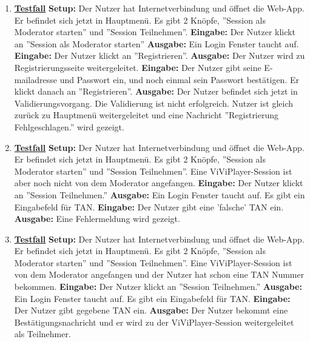 \begin{enumerate}
	\item \underline{\textbf{Testfall}} \linebreak
	\textbf{Setup:} Der Nutzer hat Internetverbindung und öffnet die Web-App. Er befindet sich jetzt in Hauptmenü. Es gibt 2 Knöpfe, ''Session als Moderator starten'' und ''Session Teilnehmen''. \linebreak
	\textbf{Eingabe:} Der Nutzer klickt an ''Session als Moderator starten'' \linebreak
	\textbf{Ausgabe:} Ein Login Fenster taucht auf.\linebreak
	\textbf{Eingabe:} Der Nutzer klickt an ''Registrieren''.\linebreak
	\textbf{Ausgabe:} Der Nutzer wird zu Registrierungsseite weitergeleitet.\linebreak
	\textbf{Eingabe:} Der Nutzer gibt seine E-mailadresse und Passwort ein, und noch einmal sein Passwort bestätigen. Er klickt danach an ''Registrieren''. \linebreak
	\textbf{Ausgabe:} Der Nutzer befindet sich jetzt in Validierungsvorgang. Die Validierung ist nicht erfolgreich. Nutzer ist gleich zurück zu Hauptmenü weitergeleitet und eine Nachricht ''Registrierung Fehlgeschlagen.'' wird gezeigt.\linebreak
	
	\item \underline{\textbf{Testfall}} \linebreak
	\textbf{Setup:} Der Nutzer hat Internetverbindung und öffnet die Web-App. Er befindet sich jetzt in Hauptmenü. Es gibt 2 Knöpfe, ''Session als Moderator starten'' und ''Session Teilnehmen''.
	Eine ViViPlayer-Session ist aber noch nicht von dem Moderator angefangen. \linebreak
	\textbf{Eingabe:} Der Nutzer klickt an ''Session Teilnehmen.'' \linebreak
	\textbf{Ausgabe:} Ein Login Fenster taucht auf. Es gibt ein Eingabefeld für TAN.\linebreak
	\textbf{Eingabe:} Der Nutzer gibt eine 'falsche' TAN ein. \linebreak
	\textbf{Ausgabe:} Eine Fehlermeldung wird gezeigt.
	
	\item \underline{\textbf{Testfall}} \linebreak
	\textbf{Setup:} Der Nutzer hat Internetverbindung und öffnet die Web-App. Er befindet sich jetzt in Hauptmenü. Es gibt 2 Knöpfe, ''Session als Moderator starten'' und ''Session Teilnehmen''. Eine ViViPlayer-Session ist von dem Moderator angefangen und der Nutzer hat schon eine TAN Nummer bekommen. \linebreak
	\textbf{Eingabe:} Der Nutzer klickt an ''Session Teilnehmen.'' \linebreak
	\textbf{Ausgabe:} Ein Login Fenster taucht auf. Es gibt ein Eingabefeld für TAN.\linebreak
	\textbf{Eingabe:} Der Nutzer gibt gegebene TAN ein. \linebreak
	\textbf{Ausgabe:} Der Nutzer bekommt eine Bestätigungsnachricht und er wird zu der ViViPlayer-Session weitergeleitet als Teilnehmer.
	

\end{enumerate}

